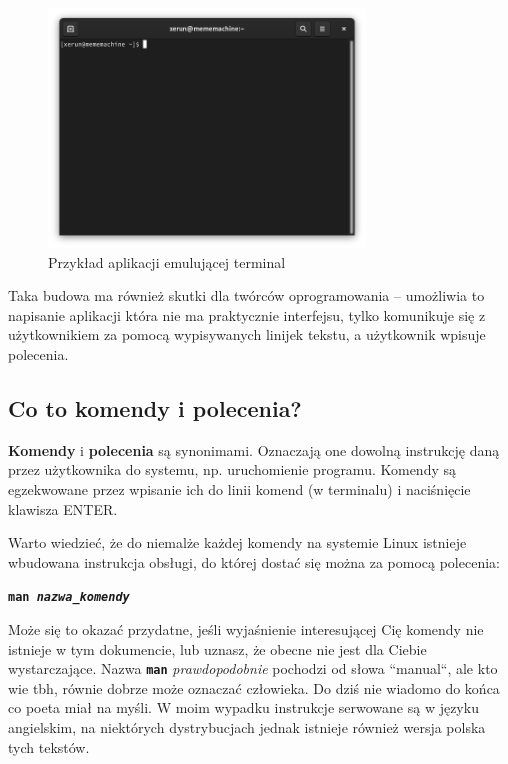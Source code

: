 \documentclass[12pt]{article}
\newcommand{\ttbf}[1]{
    \texttt{\textbf{#1}}
}
\begin{document}
\begin{figure}[H]
    \centering
    \includegraphics[width=0.75\textwidth]{przyklad terminal.png}
    \caption{Przykład aplikacji emulującej terminal}
\end{figure}

Taka budowa ma również skutki dla twórców oprogramowania -- umożliwia to napisanie aplikacji która nie ma praktycznie interfejsu, tylko komunikuje się z użytkownikiem za pomocą wypisywanych linijek tekstu, a użytkownik wpisuje polecenia. 

\subsection{Co to komendy i polecenia?}

\textbf{Komendy} i \textbf{polecenia} są synonimami. Oznaczają one dowolną instrukcję daną przez użytkownika do systemu, np. uruchomienie programu. Komendy są egzekwowane przez wpisanie ich do linii komend (w terminalu) i naciśnięcie klawisza ENTER.

Warto wiedzieć, że do niemalże każdej komendy na systemie Linux istnieje wbudowana instrukcja obsługi, do której dostać się można za pomocą polecenia:

\ttbf{man \emph{nazwa\_komendy}}

Może się to okazać przydatne, jeśli wyjaśnienie interesującej Cię komendy nie istnieje w tym dokumencie, lub uznasz, że obecne nie jest dla Ciebie wystarczające. Nazwa \ttbf{man} \emph{prawdopodobnie} pochodzi od słowa ``manual``, ale kto wie tbh, równie dobrze może oznaczać człowieka. Do dziś nie wiadomo do końca co poeta miał na myśli. W moim wypadku instrukcje serwowane są w języku angielskim, na niektórych dystrybucjach jednak istnieje również wersja polska tych tekstów.
\end{document}
